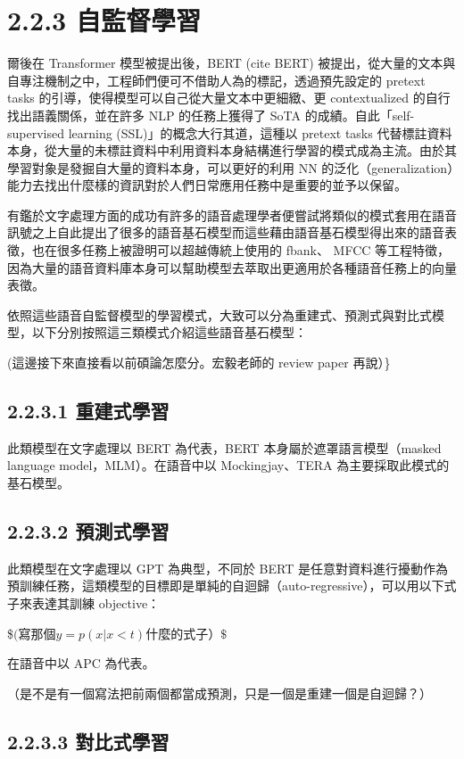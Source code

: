 \section{2.2.3 自監督學習}

爾後在 Transformer 模型被提出後，BERT (cite BERT) 被提出，從大量的文本與自專注機制之中，工程師們便可不借助人為的標記，透過預先設定的 pretext tasks 的引導，使得模型可以自己從大量文本中更細緻、更 contextualized 的自行找出語義關係，並在許多 NLP 的任務上獲得了 SoTA 的成績。自此「self-supervised learning (SSL)」的概念大行其道，這種以 pretext tasks 代替標註資料本身，從大量的未標註資料中利用資料本身結構進行學習的模式成為主流。由於其學習對象是發掘自大量的資料本身，可以更好的利用 NN 的泛化（generalization）能力去找出什麼樣的資訊對於人們日常應用任務中是重要的並予以保留。

有鑑於文字處理方面的成功有許多的語音處理學者便嘗試將類似的模式套用在語音訊號之上自此提出了很多的語音基石模型而這些藉由語音基石模型得出來的語音表徵，也在很多任務上被證明可以超越傳統上使用的 fbank、 MFCC 等工程特徵，因為大量的語音資料庫本身可以幫助模型去萃取出更適用於各種語音任務上的向量表徵。

依照這些語音自監督模型的學習模式，大致可以分為重建式、預測式與對比式模型，以下分別按照這三類模式介紹這些語音基石模型：

(這邊接下來直接看以前碩論怎麼分。宏毅老師的 review paper 再說）\}

\subsection{2.2.3.1 重建式學習}

此類模型在文字處理以 BERT 為代表，BERT 本身屬於遮罩語言模型（masked language model，MLM）。在語音中以 Mockingjay、TERA 為主要採取此模式的基石模型。

\subsection{2.2.3.2 預測式學習}

此類模型在文字處理以 GPT 為典型，不同於 BERT 是任意對資料進行擾動作為預訓練任務，這類模型的目標即是單純的自迴歸（auto-regressive），可以用以下式子來表達其訓練 objective：

\$$ (寫那個 y = p(x|x<t) 什麼的式子）\$$

在語音中以 APC 為代表。

（是不是有一個寫法把前兩個都當成預測，只是一個是重建一個是自迴歸？）

\subsection{2.2.3.3 對比式學習}

